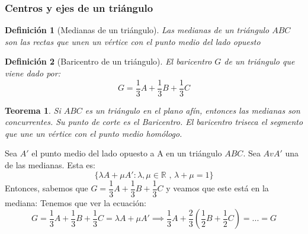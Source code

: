 \documentclass[11pt, a4paper, titlepage]{article}
\makeatletter
\renewenvironment{proof}[1][\proofname] {\vspace{-15pt}\par\pushQED{\qed}\normalfont\topsep6\p@\@plus6\p@\relax\trivlist\item[\hskip\labelsep\it#1\@addpunct{.}]\ignorespaces}{\popQED\endtrivlist\@endpefalse}
\newcommand{\R}{\mathbb{R}}
\renewcommand{\vec}{\overrightarrow}
\renewenvironment{proof}[1][\proofname] {\par\pushQED{\qed}\normalfont\topsep6\p@\@plus6\p@\relax\trivlist\item[\hskip\labelsep\itshape\sffamily#1\@addpunct{.}]\ignorespaces}{\popQED\endtrivlist\@endpefalse}
\theoremstyle{theorem-style}
\newtheorem{nth}{Teorema}[section]
\theoremstyle{definition-style}
\newtheorem{ndef}{Definición}[section]
\theoremstyle{remark-style}
\theoremstyle{example-style}
\makeatother
\begin{document}
\subsubsection{Centros y ejes de un triángulo}

\begin{ndef}[Medianas de un triángulo]
  Las medianas de un triángulo $ABC$ son las rectas que unen un vértice con el punto medio del lado opuesto
\end{ndef}
\begin{ndef}[Baricentro de un triángulo]
  El baricentro $G$ de un triángulo que viene dado por:
  \[
    G = \dfrac{1}{3} A +  \dfrac{1}{3} B +  \dfrac{1}{3} C
  \]
\end{ndef}

\begin{nth}
  Si $ABC$ es un triángulo en el plano afín, entonces las medianas son concurrentes. Su punto de corte es el Baricentro. El baricentro triseca el segmento que une un vértice con el punto medio homólogo.


\end{nth}



\begin{proof}
  Sea $A'$ el punto medio del lado opuesto a A en un triángulo $ABC$. Sea $AvA'$ una de las medianas. Esta es:
  \[
    \{\lambda A + \mu A': \lambda, \mu \in \R \text{ , } \lambda+\mu = 1\}
  \]
  Entonces, sabemos que $G = \dfrac{1}{3} A +  \dfrac{1}{3} B +  \dfrac{1}{3} C$ y veamos que este está en la mediana: Tenemos que ver la ecuación:
  \[
    G = \dfrac{1}{3} A +  \dfrac{1}{3} B +  \dfrac{1}{3} C = \lambda A + \mu A'  \implies \dfrac{1}{3}A + \dfrac{2}{3}(\dfrac{1}{2}B+\dfrac{1}{2}C) = ... = G
  \]

\end{proof}
\end{document}
